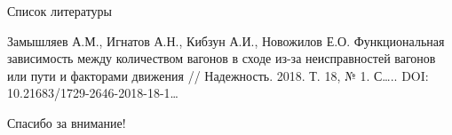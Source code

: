 \documentclass[aspectratio=169]{beamer}
\begin{document}
    \begin{frame}{Список литературы}
        \begin{thebibliography}{00}
             Замышляев А.М., Игнатов А.Н., Кибзун А.И., Новожилов Е.О. Функциональная зависимость между количеством вагонов в сходе из-за неисправностей вагонов или пути и факторами движения // Надежность. 2018. Т. 18, № 1. С….. DOI: 10.21683/1729-2646-2018-18-1…
        \end{thebibliography}
     \end{frame}
    
    \begin{frame}{}
        \centering
        \Huge
        Спасибо за внимание!
    \end{frame}
\end{document}
